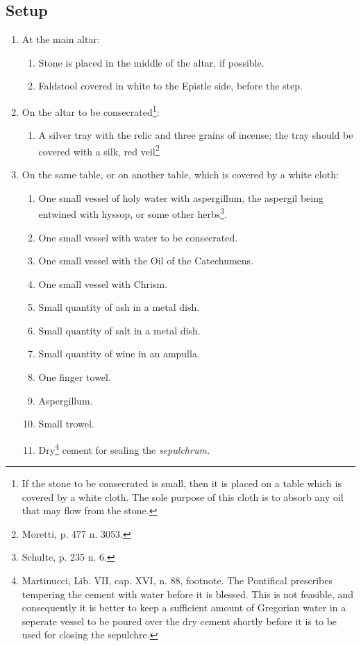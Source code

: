 \documentclass[letterpaper, twocolumn]{article}
\begin{document}
\subsection*{Setup} 
\begin{enumerate}
	\item At the main altar:
	\begin{enumerate}
		\item Stone is placed in the middle of the altar, if possible.
		\item Faldstool covered in white to the Epistle side, before the step.
	\end{enumerate}
	\item On the altar to be consecrated\footnote{If the stone to be consecrated is small, then it is placed on a table which is covered by a white cloth. The sole purpose of this cloth is to absorb any oil that may flow from the stone.}:
	\begin{enumerate}
		\item A silver tray with the relic and three grains of incense; the tray should be covered with a silk, red veil\footnote{Moretti, p. 477 n. 3053.}
	\end{enumerate}
	\item On the same table, or on another table, which is covered by a white cloth:
	\begin{enumerate}
		\item One small vessel of holy water with aspergillum, the aspergil being entwined with hyssop, or some other herbs\footnote{Schulte, p. 235 n. 6.}.
		\item One small vessel with water to be consecrated.
		\item One small vessel with the Oil of the Catechumens.
		\item One small vessel with Chrism.
		\item Small quantity of ash in a metal dish.
		\item Small quantity of salt in a metal dish.
		\item Small quantity of wine in an ampulla.
		\item One finger towel.
		\item Aspergillum.
		\item Small trowel.
		\item Dry\footnote{Martinucci, Lib. VII, cap. XVI, n. 88, footnote. The Pontifical prescribes tempering the cement with water before it is blessed. This is not feasible, and consequently it is better to keep a sufficient amount of Gregorian water in a seperate vessel to be poured over the dry cement shortly before it is to be used for closing the sepulchre.} cement for sealing the \textit{sepulchrum.}

\end{enumerate}
\end{enumerate}
\end{document}
